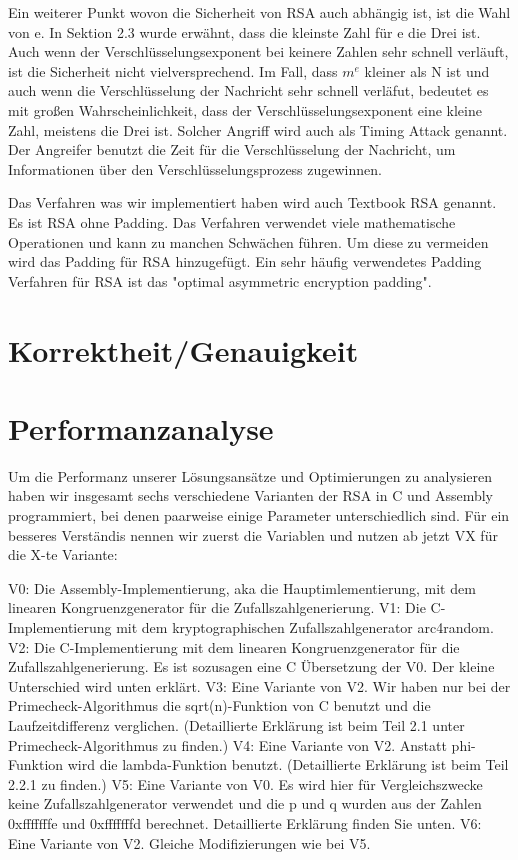 \documentclass[course=asp]{aspdoc}
\begin{document}
Ein weiterer Punkt wovon die Sicherheit von RSA auch abhängig ist, ist die Wahl von e. In Sektion 2.3 wurde erwähnt, dass die kleinste Zahl für e die Drei ist. Auch wenn der Verschlüsselungsexponent bei keinere Zahlen sehr schnell verläuft, ist die Sicherheit nicht vielversprechend. Im Fall, dass $m^{e}$ kleiner als N ist und auch wenn die Verschlüsselung der Nachricht sehr schnell verläfut, bedeutet es mit großen Wahrscheinlichkeit, dass der Verschlüsselungsexponent eine kleine Zahl, meistens die Drei ist. Solcher Angriff wird auch als Timing Attack genannt. Der Angreifer benutzt die Zeit für die Verschlüsselung der Nachricht, um Informationen über den Verschlüsselungsprozess zugewinnen. \cite{TheRSAAlgorithm}

Das Verfahren was wir implementiert haben wird auch Textbook RSA genannt. Es ist RSA ohne Padding. Das Verfahren verwendet viele mathematische Operationen und kann zu manchen Schwächen führen. Um diese zu vermeiden wird das Padding für RSA hinzugefügt.  Ein sehr häufig verwendetes Padding Verfahren für RSA ist das "optimal asymmetric encryption padding". \cite{DefinitionoftextbookRSA}




\section{Korrektheit/Genauigkeit}


\section{Performanzanalyse}
Um die Performanz unserer Lösungsansätze und Optimierungen zu analysieren haben wir insgesamt sechs verschiedene Varianten der RSA in C und Assembly programmiert, bei denen paarweise einige Parameter unterschiedlich sind. Für ein besseres Verständis nennen wir zuerst die Variablen und nutzen ab jetzt VX für die X-te Variante:

V0: Die Assembly-Implementierung, aka die Hauptimlementierung, mit dem linearen Kongruenzgenerator für die Zufallszahlgenerierung.
V1: Die C-Implementierung mit dem kryptographischen Zufallszahlgenerator arc4random.
V2: Die C-Implementierung mit dem linearen Kongruenzgenerator für die Zufallszahlgenerierung. Es ist sozusagen eine C Übersetzung der V0. Der kleine Unterschied wird unten erklärt.
V3: Eine Variante von V2. Wir haben nur bei der Primecheck-Algorithmus die sqrt(n)-Funktion von C benutzt und die Laufzeitdifferenz verglichen. (Detaillierte Erklärung ist beim Teil 2.1 unter Primecheck-Algorithmus zu finden.)
V4: Eine Variante von V2. Anstatt phi-Funktion wird die lambda-Funktion benutzt. (Detaillierte Erklärung ist beim Teil 2.2.1 zu finden.)
V5: Eine Variante von V0. Es wird hier für Vergleichszwecke keine Zufallszahlgenerator verwendet und die p und q wurden aus der Zahlen 0xfffffffe und 0xfffffffd berechnet. Detaillierte Erklärung finden Sie unten.
V6: Eine Variante von V2. Gleiche Modifizierungen wie bei V5.
\end{document}
